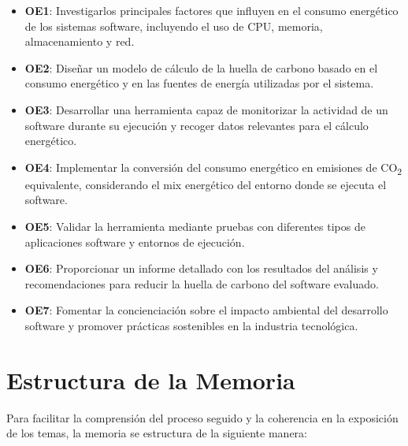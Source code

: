 \documentclass[12pt,a4paper]{report}
\begin{document}
\begin{itemize}
  \item \textbf{OE1}: Investigarlos principales factores que influyen en el consumo
        energético de los sistemas software, incluyendo el uso de CPU, memoria,
        almacenamiento y red.
  \item \textbf{OE2}: Diseñar un modelo de cálculo de la huella de carbono basado en el consumo
        energético y en las fuentes de energía utilizadas por el sistema.
  \item \textbf{OE3}: Desarrollar una herramienta capaz de monitorizar la actividad de un software
        durante su ejecución y recoger datos relevantes para el cálculo energético.
  \item \textbf{OE4}: Implementar la conversión del consumo energético en emisiones de
        CO\textsubscript{2} equivalente, considerando el mix energético del entorno
        donde se ejecuta el software.
  \item \textbf{OE5}: Validar la herramienta mediante pruebas con diferentes tipos de aplicaciones
        software y entornos de ejecución.
  \item \textbf{OE6}: Proporcionar un informe detallado con los resultados del análisis y
        recomendaciones para reducir la huella de carbono del software evaluado.
  \item \textbf{OE7}: Fomentar la concienciación sobre el impacto ambiental del desarrollo software y
        promover prácticas sostenibles en la industria tecnológica.
\end{itemize}

\section{Estructura de la Memoria}

Para facilitar la comprensión del proceso seguido y la coherencia en la
exposición de los temas, la memoria se estructura de la siguiente manera:
\end{document}
